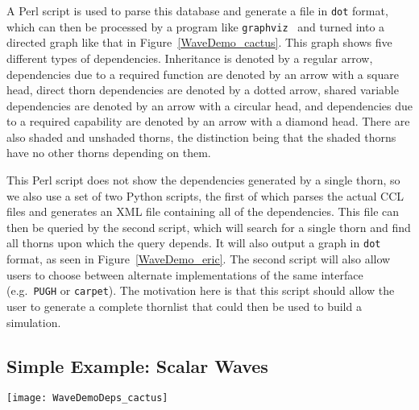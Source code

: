 \documentclass[conference]{IEEEtran}
\begin{document}
A Perl script is used to parse this database and generate a file in \texttt{dot} format, which
can then be processed by a program like \texttt{graphviz}~\cite{graphvizweb} and turned into a directed graph like that
in Figure~\ref{WaveDemo_cactus}. This graph shows five different types of dependencies. 
Inheritance is denoted by a regular arrow, dependencies due to a required function are denoted by 
an arrow with a square head, direct thorn dependencies are denoted by a dotted arrow, shared
variable dependencies are denoted by an arrow with a circular head, and dependencies due to a
required capability are denoted by an arrow with a diamond head. There are also shaded and 
unshaded thorns, the distinction being that the shaded thorns have no other thorns depending on them.

This Perl script does not show the dependencies generated by a single thorn, so we also use a set of two Python
scripts, the first of which parses the actual CCL files and generates an XML file containing all of the dependencies.
This file can then be queried by the second script, which will search for a single thorn and find
all thorns upon which the query depends. It will also output a graph in \texttt{dot} format, as seen in
Figure~\ref{WaveDemo_eric}. The second script will also allow users to choose between
alternate implementations of the same interface (e.g.\ \texttt{PUGH} or \texttt{carpet}). The motivation
here is that this script should allow the user to generate a complete thornlist that could then be used
to build a simulation.


\subsection{Simple Example: Scalar Waves}

\begin{figure*}[t!]
\centering
\texttt{[image: WaveDemoDeps\_cactus]}
\caption{\label{WaveDemo_cactus}
Dependency graph for complete set of thorns in the simple example application {\tt 
WaveToy Demo}. The shaded items indicate that the thorns are `leaves' and have no thorns 
depending on them.}
\end{figure*}
\end{document}
